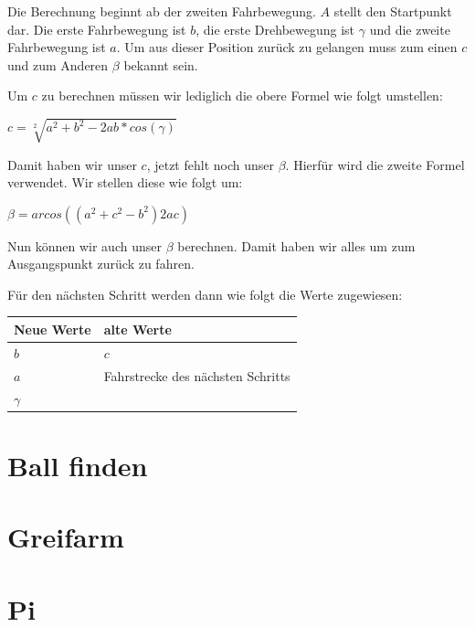 Die Berechnung beginnt ab der zweiten Fahrbewegung. $A$ stellt den Startpunkt dar. Die erste Fahrbewegung ist $b$, die erste Drehbewegung ist $\gamma$ und die zweite Fahrbewegung ist $a$. Um aus dieser Position zurück zu gelangen muss zum einen $c$ und zum Anderen $\beta$ bekannt sein.

Um $c$ zu berechnen müssen wir lediglich die obere Formel wie folgt umstellen:

$c = \sqrt[2]{a^2 + b^2 - 2ab*cos(\gamma)}$

Damit haben wir unser $c$, jetzt fehlt noch unser $\beta$. Hierfür wird die zweite Formel verwendet. Wir stellen diese wie folgt um:

$\beta = arcos((a^2 + c^2 - b^2)2ac)$

Nun können wir auch unser $\beta$ berechnen. Damit haben wir alles um zum Ausgangspunkt zurück zu fahren.

Für den nächsten Schritt werden dann wie folgt die Werte zugewiesen:\\
\begin{tabular}[htbp]{|l|l|}
	Neue Werte & alte Werte \\
	\hline
	$b$ & $c$ \\
	\hline
	$a$ & Fahrstrecke des nächsten Schritts \\
	\hline
	$\gamma$ & \\
\end{tabular}

\section{Ball finden}

\section{Greifarm}

\section{Pi}